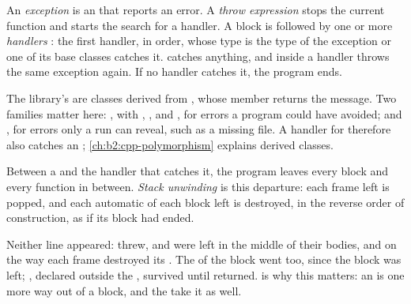 \begin{definition}\label{def:b2:cpp-classes-raii:exception}
An \emph{exception} is an  that reports an error. A \emph{throw
expression}  stops the current function and starts the search for a handler.
A  block is followed by one or more \emph{handlers}
: the first handler, in order, whose type  is the type of the exception or
one of its base classes catches it.  catches anything, and  inside a handler throws
the same exception again. If no handler catches it, the program ends.
\end{definition}

The library's  are classes derived from , whose member  returns the
message. Two families matter here: , with ,
,  and , for errors a program could have
avoided; and , for errors only a run can reveal, such as a missing file.
A handler for  therefore also catches an ;
\cref{ch:b2:cpp-polymorphism} explains derived classes.

\begin{definition}\label{def:b2:cpp-classes-raii:unwinding}
Between a  and the handler that catches it, the program leaves every block and every function in
between. \emph{Stack unwinding} is this departure: each frame left is popped, and each automatic
 of each block left is destroyed, in the reverse order of construction, as if its block had ended.
\end{definition}

\label{lst:b2:cpp-classes-raii:unwind}

\label{out:b2:cpp-classes-raii:unwind}

Neither  line appeared:  threw,  and  were left
in the middle of their bodies, and on the way each frame destroyed its . The  of the
 block went too, since the block was left; , declared outside the , survived until
 returned.  is why this matters: an  is one more way
out of a block, and the  take it as well.

